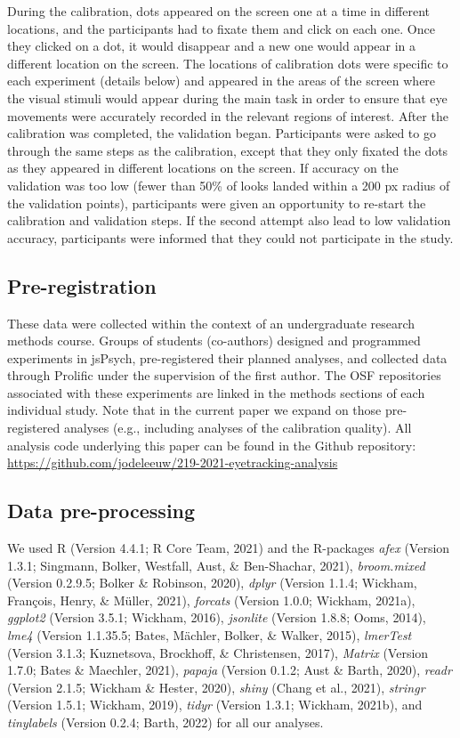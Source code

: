 \documentclass[
  man,floatsintext]{apa6}
\begin{document}
During the calibration, dots appeared on the screen one at a time in
different locations, and the participants had to fixate them and click
on each one. Once they clicked on a dot, it would disappear and a new
one would appear in a different location on the screen. The locations of
calibration dots were specific to each experiment (details below) and
appeared in the areas of the screen where the visual stimuli would
appear during the main task in order to ensure that eye movements were
accurately recorded in the relevant regions of interest. After the
calibration was completed, the validation began. Participants were asked
to go through the same steps as the calibration, except that they only
fixated the dots as they appeared in different locations on the screen.
If accuracy on the validation was too low (fewer than 50\% of looks
landed within a 200 px radius of the validation points),
participants were given an opportunity to re-start the calibration and
validation steps. If the second attempt also lead to low validation
accuracy, participants were informed that they could not participate in
the study.

\subsection{Pre-registration}\label{pre-registration}

These data were collected within the context of an undergraduate research methods course. Groups of students (co-authors) designed and programmed experiments in jsPsych, pre-registered their planned analyses, and collected data through Prolific under the supervision of the first author. The OSF repositories associated with these experiments are linked in the methods sections of each individual study. Note that in the current paper we expand on those pre-registered analyses (e.g., including analyses of the calibration quality). All analysis code underlying this paper can be found in the Github repository: \url{https://github.com/jodeleeuw/219-2021-eyetracking-analysis}

\subsection{Data pre-processing}\label{data-pre-processing}

We used R (Version 4.4.1; R Core Team, 2021) and the R-packages \emph{afex} (Version 1.3.1; Singmann, Bolker, Westfall, Aust, \& Ben-Shachar, 2021), \emph{broom.mixed} (Version 0.2.9.5; Bolker \& Robinson, 2020), \emph{dplyr} (Version 1.1.4; Wickham, François, Henry, \& Müller, 2021), \emph{forcats} (Version 1.0.0; Wickham, 2021a), \emph{ggplot2} (Version 3.5.1; Wickham, 2016), \emph{jsonlite} (Version 1.8.8; Ooms, 2014), \emph{lme4} (Version 1.1.35.5; Bates, Mächler, Bolker, \& Walker, 2015), \emph{lmerTest} (Version 3.1.3; Kuznetsova, Brockhoff, \& Christensen, 2017), \emph{Matrix} (Version 1.7.0; Bates \& Maechler, 2021), \emph{papaja} (Version 0.1.2; Aust \& Barth, 2020), \emph{readr} (Version 2.1.5; Wickham \& Hester, 2020), \emph{shiny} (Chang et al., 2021), \emph{stringr} (Version 1.5.1; Wickham, 2019), \emph{tidyr} (Version 1.3.1; Wickham, 2021b), and \emph{tinylabels} (Version 0.2.4; Barth, 2022) for all our analyses.
\end{document}
